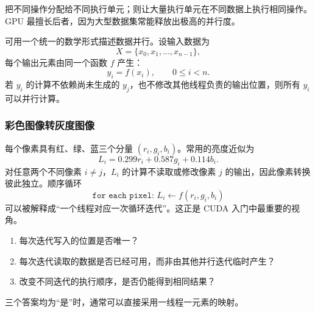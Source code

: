 把不同操作分配给不同执行单元；则让大量执行单元在不同数据上执行相同操作。GPU 最擅长后者，因为大型数据集常能释放出极高的并行度。


可用一个统一的数学形式描述数据并行。设输入数据为
\[
X = \{x_0,x_1,\ldots,x_{n-1}\},
\]
每个输出元素由同一个函数 $f$ 产生：
\[
y_i=f(x_i),\qquad 0\le i<n.
\]
若 $y_i$ 的计算不依赖尚未生成的 $y_j$，也不修改其他线程负责的输出位置，则所有 $y_i$ 可以并行计算。

\subsubsection{彩色图像转灰度图像}

每个像素具有红、绿、蓝三个分量 $(r_i,g_i,b_i)$。常用的亮度近似为
\[
L_i = 0.299r_i + 0.587g_i + 0.114b_i.
\]
对任意两个不同像素 $i\ne j$，$L_i$ 的计算不读取或修改像素 $j$ 的输出，因此像素转换彼此独立。顺序循环
\[
\texttt{for each pixel: } L_i\leftarrow f(r_i,g_i,b_i)
\]
可以被解释成“一个线程对应一次循环迭代”。这正是 CUDA 入门中最重要的视角。

\begin{warningbox}[title={判断数据并行时必须问的三个问题}]
\begin{enumerate}
  \item 每次迭代写入的位置是否唯一？
  \item 每次迭代读取的数据是否已经可用，而非由其他并行迭代临时产生？
  \item 改变不同迭代的执行顺序，是否仍能得到相同结果？
\end{enumerate}
三个答案均为“是”时，通常可以直接采用一线程一元素的映射。
\end{warningbox}
